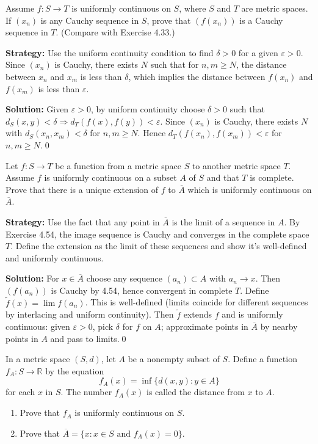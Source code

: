 \begin{problembox}
Assume $f : S \to T$ is uniformly continuous on $S$, where $S$ and $T$ are metric spaces. If $(x_n)$ is any Cauchy sequence in $S$, prove that $(f(x_n))$ is a Cauchy sequence in $T$. (Compare with Exercise 4.33.)
\end{problembox}

\noindent\textbf{Strategy:} Use the uniform continuity condition to find $\delta > 0$ for a given $\varepsilon > 0$. Since $(x_n)$ is Cauchy, there exists $N$ such that for $n, m \geq N$, the distance between $x_n$ and $x_m$ is less than $\delta$, which implies the distance between $f(x_n)$ and $f(x_m)$ is less than $\varepsilon$.

\bigskip\noindent\textbf{Solution:}
Given $\varepsilon>0$, by uniform continuity choose $\delta>0$ such that $d_S(x,y)<\delta\Rightarrow d_T(f(x),f(y))<\varepsilon$. Since $(x_n)$ is Cauchy, there exists $N$ with $d_S(x_n,x_m)<\delta$ for $n,m\ge N$. Hence $d_T(f(x_n),f(x_m))<\varepsilon$ for $n,m\ge N$.\qed



\begin{problembox}
Let $f : S \to T$ be a function from a metric space $S$ to another metric space $T$. Assume $f$ is uniformly continuous on a subset $A$ of $S$ and that $T$ is complete. Prove that there is a unique extension of $f$ to $\overline{A}$ which is uniformly continuous on $\overline{A}$.
\end{problembox}

\noindent\textbf{Strategy:} Use the fact that any point in $\overline{A}$ is the limit of a sequence in $A$. By Exercise 4.54, the image sequence is Cauchy and converges in the complete space $T$. Define the extension as the limit of these sequences and show it's well-defined and uniformly continuous.

\bigskip\noindent\textbf{Solution:}
For $x\in\overline{A}$ choose any sequence $(a_n)\subset A$ with $a_n\to x$. Then $(f(a_n))$ is Cauchy by 4.54, hence convergent in complete $T$. Define $\tilde f(x)=\lim f(a_n)$. This is well-defined (limits coincide for different sequences by interlacing and uniform continuity). Then $\tilde f$ extends $f$ and is uniformly continuous: given $\varepsilon>0$, pick $\delta$ for $f$ on $A$; approximate points in $\overline{A}$ by nearby points in $A$ and pass to limits.\qed



\begin{problembox}
In a metric space $(S, d)$, let $A$ be a nonempty subset of $S$. Define a function $f_A : S \to \mathbb{R}$ by the equation
\[f_A(x) = \inf \{d(x, y) : y \in A\}\]
for each $x$ in $S$. The number $f_A(x)$ is called the distance from $x$ to $A$.
\begin{enumerate}[label=(\alph*)]
\item Prove that $f_A$ is uniformly continuous on $S$.
\item Prove that $\overline{A} = \{x : x \in S \text{ and } f_A(x) = 0\}$.
\end{enumerate}
\end{problembox}

